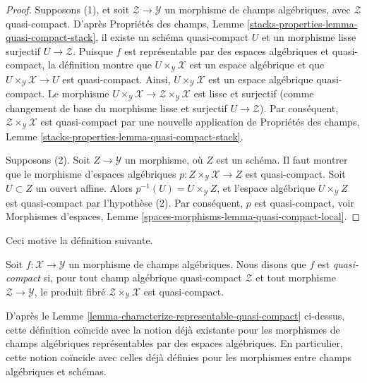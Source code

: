 \begin{proof}
Supposons (1), et soit $\mathcal{Z} \to \mathcal{Y}$ un morphisme de champs
algébriques, avec $\mathcal{Z}$ quasi-compact. D'après Propriétés des champs,
Lemme \ref{stacks-properties-lemma-quasi-compact-stack}, il existe un schéma
quasi-compact $U$ et un morphisme lisse surjectif
$U \to \mathcal{Z}$. Puisque $f$ est représentable par des espaces
algébriques et quasi-compact, la définition montre que
$U \times_\mathcal{Y} \mathcal{X}$ est un espace algébrique et que
$U \times_\mathcal{Y} \mathcal{X} \to U$ est quasi-compact.
Ainsi, $U \times_\mathcal{Y} \mathcal{X}$ est un espace algébrique
quasi-compact. Le morphisme
$U \times_\mathcal{Y} \mathcal{X} \to
\mathcal{Z} \times_\mathcal{Y} \mathcal{X}$
est lisse et surjectif (comme changement de base du morphisme lisse et
surjectif $U \to \mathcal{Z}$). Par conséquent,
$\mathcal{Z} \times_\mathcal{Y} \mathcal{X}$ est quasi-compact par une
nouvelle application de Propriétés des champs, Lemme
\ref{stacks-properties-lemma-quasi-compact-stack}.

\medskip\noindent
Supposons (2). Soit $Z \to \mathcal{Y}$ un morphisme, où $Z$ est un schéma.
Il faut montrer que le morphisme d'espaces algébriques
$p : Z \times_\mathcal{Y} \mathcal{X} \to Z$ est quasi-compact.
Soit $U \subset Z$ un ouvert affine. Alors
$p^{-1}(U) = U \times_\mathcal{Y} Z$,
et l'espace algébrique $U \times_\mathcal{Y} Z$ est quasi-compact
par l'hypothèse (2). Par conséquent, $p$ est quasi-compact, voir Morphismes
d'espaces, Lemme \ref{spaces-morphisms-lemma-quasi-compact-local}.
\end{proof}

\noindent
Ceci motive la définition suivante.

\begin{definition}
\label{definition-quasi-compact}
Soit $f : \mathcal{X} \to \mathcal{Y}$ un morphisme de champs algébriques.
Nous disons que $f$ est {\it quasi-compact} si, pour tout champ algébrique
quasi-compact $\mathcal{Z}$ et tout morphisme
$\mathcal{Z} \to \mathcal{Y}$, le produit fibré
$\mathcal{Z} \times_\mathcal{Y} \mathcal{X}$ est quasi-compact.
\end{definition}

\noindent
D'après le Lemme \ref{lemma-characterize-representable-quasi-compact}
ci-dessus, cette définition coïncide avec la notion déjà existante pour les
morphismes de champs algébriques représentables par des espaces algébriques.
En particulier, cette notion coïncide avec celles déjà définies pour les
morphismes entre champs algébriques et schémas.

